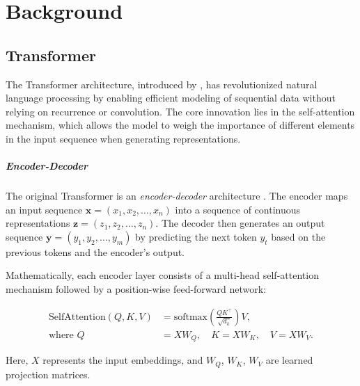 \chapter{Background}\label{background}



\section{Transformer}\label{sec:transformer_arch}

The Transformer architecture, introduced by \textcite{vaswani_attention_2017}, has revolutionized natural language processing by enabling efficient modeling of sequential data without relying on recurrence or convolution. The core innovation lies in the self-attention mechanism, which allows the model to weigh the importance of different elements in the input sequence when generating representations.

\paragraph{Encoder-Decoder}


The original Transformer is an \emph{encoder-decoder} architecture \parencite{vaswani_attention_2017}. The encoder maps an input sequence $\mathbf{x} = (x_1, x_2, \dots, x_n)$ into a sequence of continuous representations $\mathbf{z} = (z_1, z_2, \dots, z_n)$. The decoder then generates an output sequence $\mathbf{y} = (y_1, y_2, \dots, y_m)$ by predicting the next token $y_t$ based on the previous tokens and the encoder's output.

Mathematically, each encoder layer consists of a multi-head self-attention mechanism followed by a position-wise feed-forward network:

\begin{align}
    \text{SelfAttention}(Q, K, V) & = \text{softmax}\left(\frac{QK^\top}{\sqrt{d_k}}\right)V, \\
    \text{where } Q               & = XW_Q, \quad K = XW_K, \quad V = XW_V.
\end{align}

Here, $X$ represents the input embeddings, and $W_Q$, $W_K$, $W_V$ are learned projection matrices.

